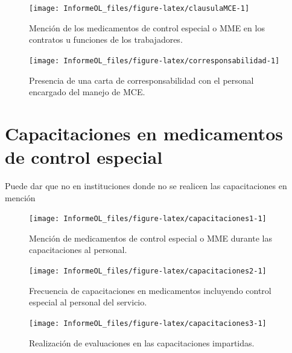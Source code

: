 \documentclass[
  oneside]{book}
\begin{document}
\begin{figure}

{\centering \texttt{[image: InformeOL\_files/figure-latex/clausulaMCE-1]} 

}

\caption{Mención de los medicamentos de control especial o MME en los contratos u funciones de los trabajadores.}\label{fig:clausulaMCE}
\end{figure}

\begin{figure}

{\centering \texttt{[image: InformeOL\_files/figure-latex/corresponsabilidad-1]} 

}

\caption{Presencia de una carta de corresponsabilidad con el personal encargado del manejo de MCE.}\label{fig:corresponsabilidad}
\end{figure}

\hypertarget{capacitaciones-en-medicamentos-de-control-especial}{%
\chapter{Capacitaciones en medicamentos de control especial}\label{capacitaciones-en-medicamentos-de-control-especial}}

Puede dar que no en instituciones donde no se realicen las capacitaciones en mención

\begin{figure}

{\centering \texttt{[image: InformeOL\_files/figure-latex/capacitaciones1-1]} 

}

\caption{Mención de medicamentos de control especial o MME durante las capacitaciones al personal.}\label{fig:capacitaciones1}
\end{figure}

\begin{figure}

{\centering \texttt{[image: InformeOL\_files/figure-latex/capacitaciones2-1]} 

}

\caption{Frecuencia de capacitaciones en medicamentos incluyendo control especial al personal del servicio.}\label{fig:capacitaciones2}
\end{figure}

\begin{figure}

{\centering \texttt{[image: InformeOL\_files/figure-latex/capacitaciones3-1]} 

}

\caption{Realización de evaluaciones en las capacitaciones impartidas.}\label{fig:capacitaciones3}
\end{figure}
\end{document}
